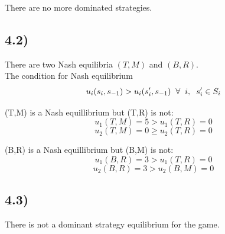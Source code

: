 \documentclass[a4paper,11pt]{article}
\begin{document}
There are no more dominated strategies.

\vspace{2cm} 
\subsection*{4.2)}

There are two Nash equilibria $(T,M)$ and $(B, R)$.\\

The condition for Nash equilibrium
\[ u_i(s_i, s_{-1}) > u_i(s'_i, s_{-1}) \hspace{2mm} \forall \hspace{2mm} i,\hspace{2mm} s'_i \in S_i \]

(T,M) is a Nash equillibrium but (T,R) is not:
\[ u_1(T, M) = 5 > u_1(T, R) = 0 \]
\[ u_2(T, M) = 0 \ge u_2(T, R) = 0 \]


(B,R) is a Nash equillibrium but (B,M) is not:
\[ u_1(B, R) = 3 > u_1(T, R) = 0 \]
\[ u_2(B, R) = 3 > u_2(B, M) = 0 \]

\subsection*{4.3)}

There is not a dominant strategy equilibrium for the game.
\end{document}
